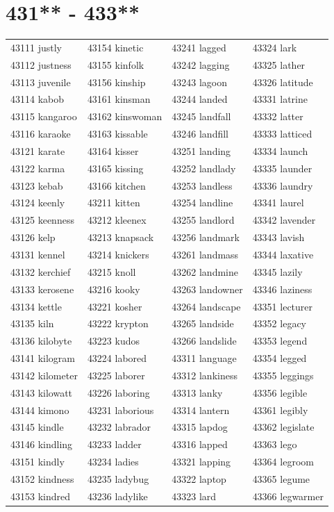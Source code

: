 \documentclass[10pt, oneside]{book}
\begin{document}
\begin{table}
	\centering
	\section*{431** - 433**}
	\begin{tabular}{l l l l}
43111 justly &43154 kinetic &43241 lagged &43324 lark\\
43112 justness &43155 kinfolk &43242 lagging &43325 lather\\
43113 juvenile &43156 kinship &43243 lagoon &43326 latitude\\
43114 kabob &43161 kinsman &43244 landed &43331 latrine\\
43115 kangaroo &43162 kinswoman &43245 landfall &43332 latter\\
43116 karaoke &43163 kissable &43246 landfill &43333 latticed\\
43121 karate &43164 kisser &43251 landing &43334 launch\\
43122 karma &43165 kissing &43252 landlady &43335 launder\\
43123 kebab &43166 kitchen &43253 landless &43336 laundry\\
43124 keenly &43211 kitten &43254 landline &43341 laurel\\
43125 keenness &43212 kleenex &43255 landlord &43342 lavender\\
43126 kelp &43213 knapsack &43256 landmark &43343 lavish\\
43131 kennel &43214 knickers &43261 landmass &43344 laxative\\
43132 kerchief &43215 knoll &43262 landmine &43345 lazily\\
43133 kerosene &43216 kooky &43263 landowner &43346 laziness\\
43134 kettle &43221 kosher &43264 landscape &43351 lecturer\\
43135 kiln &43222 krypton &43265 landside &43352 legacy\\
43136 kilobyte &43223 kudos &43266 landslide &43353 legend\\
43141 kilogram &43224 labored &43311 language &43354 legged\\
43142 kilometer &43225 laborer &43312 lankiness &43355 leggings\\
43143 kilowatt &43226 laboring &43313 lanky &43356 legible\\
43144 kimono &43231 laborious &43314 lantern &43361 legibly\\
43145 kindle &43232 labrador &43315 lapdog &43362 legislate\\
43146 kindling &43233 ladder &43316 lapped &43363 lego\\
43151 kindly &43234 ladies &43321 lapping &43364 legroom\\
43152 kindness &43235 ladybug &43322 laptop &43365 legume\\
43153 kindred &43236 ladylike &43323 lard &43366 legwarmer\\
	\end{tabular}
 \end{table}
\clearpage
\end{document}
